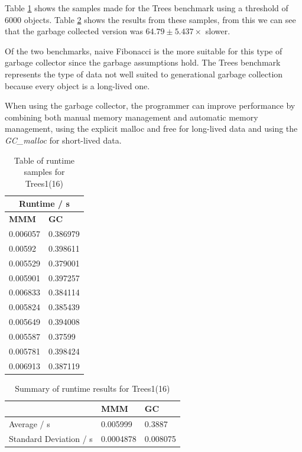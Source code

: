 \documentclass[../diss.tex]{subfiles}
\begin{document}
Table \ref{tab:treesamples} shows the samples made for the Trees benchmark using a threshold of 6000 objects. Table \ref{tab:treesummary} shows the results from these samples, from this we can see that the garbage collected version was $64.79 \pm 5.437\times$ slower.

Of the two benchmarks, naive Fibonacci is the more suitable for this type of garbage collector since the garbage assumptions hold. The Trees benchmark represents the type of data not well suited to generational garbage collection because every object is a long-lived one. 

When using the garbage collector, the programmer can improve performance by combining both manual memory management and automatic memory management, using the explicit malloc and free for long-lived data and using the \emph{GC\_malloc} for short-lived data.

\begin{table}
    \centering
    \begin{tabular}{| l | l |}
        \hline
         \multicolumn{2}{|c|}{\bf{Runtime / s}} \\ \hline
         \bf{MMM} & \bf{GC} \\ \hline
         0.006057 & 0.386979 \\ \hline
         0.00592 & 0.398611 \\ \hline
         0.005529 & 0.379001 \\ \hline
         0.005901 &	0.397257 \\ \hline
         0.006833 &	0.384114 \\ \hline
         0.005824 &	0.385439 \\ \hline
         0.005649 &	0.394008 \\ \hline
         0.005587 &	0.37599 \\ \hline
         0.005781 &	0.398424 \\ \hline
         0.006913 & 0.387119 \\ \hline
    \end{tabular}
    \caption{Table of runtime samples for Trees1(16)}
    \label{tab:treesamples}
\end{table}

\begin{table}
    \centering
    \begin{tabular}{| l | l | l |}
        \hline
         & \bf{MMM} & \bf{GC} \\ \hline
         Average / s & 0.005999 & 0.3887 \\ \hline
         Standard Deviation / s & 0.0004878 & 0.008075 \\ \hline
        
    \end{tabular}
    \caption{Summary of runtime results for Trees1(16)}
    \label{tab:treesummary}
\end{table}
\end{document}
